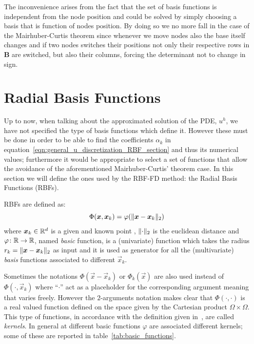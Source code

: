 The inconvenience arises from the fact that the set of basis functions is independent from the node position and could be solved by simply choosing a basis that is function of nodes position. By doing so we no more fall in the case of the Mairhuber-Curtis theorem since whenever we move nodes also the base itself changes and if two nodes switches their positions not only their respective rows in $\boldsymbol{B}$ are switched, but also their columns, forcing the determinant not to change in sign.




\section{Radial Basis Functions}
\label{subsec:radial_basis_functions}

Up to now, when talking about the approximated solution of the PDE, $u^h$, we have not specified the type of basis functions which define it. However these must be done in order to be able to find the coefficients $\alpha_k$ in equation~\eqref{eqn:general_u_discretization_RBF_section} and thus its numerical values; furthermore it would be appropriate to select a set of functions that allow the avoidance of the aforementioned Mairhuber-Curtis' theorem case. In this section we will define the ones used by the RBF-FD method: the Radial Basis Functions (RBFs).

RBFs are defined as:
\begin{equation}
	\label{eq:RBF_definition}
	\Phi(\boldsymbol{x}, \boldsymbol{x}_k) = \varphi(\lVert\boldsymbol{x} - \boldsymbol{x}_k\rVert_2)
\end{equation}
where $\boldsymbol{x}_k \in \mathbb{R}^d$ is a given and known point , $\lVert\cdot\rVert_2$ is the euclidean distance and $\varphi\colon \mathbb{R} \to \mathbb{R}$, named \emph{basic} function, is a (univariate) function which takes the radius $r_k = \lVert\boldsymbol{x} - \boldsymbol{x}_k\rVert_2$ as input and it is used as generator for all the (multivariate) \emph{basis} functions associated to different $\vec{x}_k$.

Sometimes the notations $\Phi(\vec{x} - \vec{x}_k)$ or $\Phi_k({\vec{x}})$ are also used instead of $\Phi(\cdot, \vec{x}_k)$ where ``$\cdot$'' act as a placeholder for the corresponding argument meaning that varies freely. However the $2$-arguments notation makes clear that $\Phi(\cdot, \cdot)$ is a real valued function defined on the space given by the Cartesian product $\Omega \times \Omega$. This type of functions, in accordance with the definition given in~\cite{Schaback:Kernel_definition}, are called \emph{kernels}. In general at different basic functions $\varphi$ are associated different kernels; some of these are reported in table~\ref{tab:basic_functions}.

